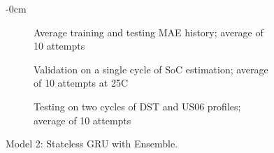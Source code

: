 \begin{figure}[H]
\begin{adjustwidth}{-\extralength}{0cm}
\begin{subfigure}[b]{0.425\textwidth}
        \caption{Average training and testing MAE history; average of 10 attempts}
    \end{subfigure}
    \hfill
    \begin{subfigure}[b]{0.425\textwidth}
        \centering
        
        \caption{Validation on a single cycle of SoC estimation; average of 10 attempts at 25\textdegree{}C}
    \end{subfigure}
    \hfill
    \begin{subfigure}[b]{0.425\textwidth}
        \centering
        
        \caption{Testing on two cycles of DST and US06 profiles; average of 10 attempts}
    \end{subfigure}
    \caption{Model 2: Stateless GRU with Ensemble.}
    \label{fig:Model-2res}
    \end{adjustwidth}
\end{figure}
\clearpage
